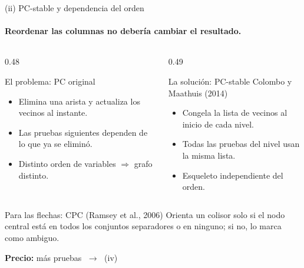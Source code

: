 \documentclass[aspectratio=169,11pt]{beamer}
\begin{document}
\begin{frame}[t]{(ii) PC-stable y dependencia del orden}
  \framesubtitle{Reordenar las columnas no debería cambiar el resultado.}
  \begin{columns}[T,onlytextwidth]
    \begin{column}{0.48\textwidth}
      \begin{alertblock}{El problema: PC original}
        \begin{itemize}
          \item Elimina una arista y actualiza los vecinos al instante.
          \item Las pruebas siguientes dependen de lo que ya se eliminó.
          \item Distinto orden de variables $\Rightarrow$ grafo distinto.
        \end{itemize}
      \end{alertblock}
    \end{column}
    \begin{column}{0.49\textwidth}
      \begin{block}{La solución: PC-stable \textperiodcentered{} Colombo y Maathuis (2014)}
        \begin{itemize}
          \item Congela la lista de vecinos al inicio de cada nivel.
          \item Todas las pruebas del nivel usan la misma lista.
          \item Esqueleto independiente del orden.
        \end{itemize}
      \end{block}
    \end{column}
  \end{columns}
  \vspace{0.2cm}
  \begin{exampleblock}{Para las flechas: CPC (Ramsey et al., 2006)}
    Orienta un colisor solo si el nodo central está en todos los conjuntos
    separadores o en ninguno; si no, lo marca como ambiguo.
  \end{exampleblock}
  \vfill
  {\small\color{upmorange}\textbf{Precio:} más pruebas
  $\;\longrightarrow\;$ (iv)}
\end{frame}
\end{document}
